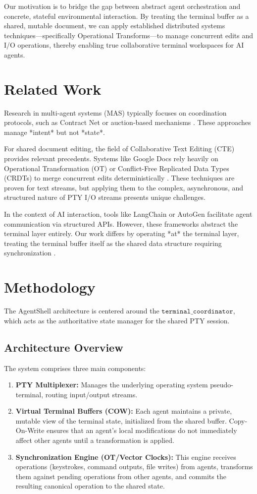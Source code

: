 \documentclass[11pt,a4paper]{article}
\begin{document}
Our motivation is to bridge the gap between abstract agent orchestration and concrete, stateful environmental interaction. By treating the terminal buffer as a shared, mutable document, we can apply established distributed systems techniques—specifically Operational Transforms—to manage concurrent edits and I/O operations, thereby enabling true collaborative terminal workspaces for AI agents.

\section{Related Work}
Research in multi-agent systems (MAS) typically focuses on coordination protocols, such as Contract Net or auction-based mechanisms \cite{smith2019mas}. These approaches manage *intent* but not *state*.

For shared document editing, the field of Collaborative Text Editing (CTE) provides relevant precedents. Systems like Google Docs rely heavily on Operational Transformation (OT) or Conflict-Free Replicated Data Types (CRDTs) to merge concurrent edits deterministically \cite{huet2014ot}. These techniques are proven for text streams, but applying them to the complex, asynchronous, and structured nature of PTY I/O streams presents unique challenges.

In the context of AI interaction, tools like LangChain or AutoGen facilitate agent communication via structured APIs. However, these frameworks abstract the terminal layer entirely. Our work differs by operating *at* the terminal layer, treating the terminal buffer itself as the shared data structure requiring synchronization \cite{openai2023agents}.

\section{Methodology}
The AgentShell architecture is centered around the $\texttt{terminal\_coordinator}$, which acts as the authoritative state manager for the shared PTY session.

\subsection{Architecture Overview}
The system comprises three main components:
\begin{enumerate}
    \item \textbf{PTY Multiplexer:} Manages the underlying operating system pseudo-terminal, routing input/output streams.
    \item \textbf{Virtual Terminal Buffers (COW):} Each agent maintains a private, mutable view of the terminal state, initialized from the shared buffer. Copy-On-Write ensures that an agent's local modifications do not immediately affect other agents until a transformation is applied.
    \item \textbf{Synchronization Engine (OT/Vector Clocks):} This engine receives operations (keystrokes, command outputs, file writes) from agents, transforms them against pending operations from other agents, and commits the resulting canonical operation to the shared state.
\end{enumerate}
\end{document}
